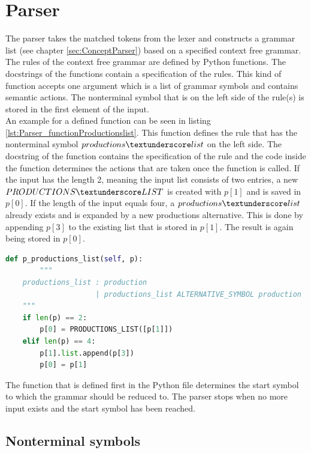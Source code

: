\section{Parser}\label{sec:ImplementationParser}
The parser takes the matched tokens from the lexer and constructs a grammar list (see chapter \ref{sec:ConceptParser}) based on a specified context free grammar.
The rules of the context free grammar are defined by Python functions.
The docstrings of the functions contain a specification of the rules.
This kind of function accepts one argument which is a list of grammar symbols and contains semantic actions. The nonterminal symbol that is on the left side of the rule(s) is stored in the first element of the input.\\
An example for a defined function can be seen in listing \ref{lst:Parser_functionProductionslist}.
This function defines the rule that has the nonterminal symbol $productions\textunderscore list$ on the left side.
The docstring of the function contains the specification of the rule and the code inside the function determines the actions that are taken once the function is called.
If the input has the length 2, meaning the input list consists of two entries, a new $PRODUCTIONS\textunderscore LIST$ is created with $p[1]$ and is saved in $p[0]$.
If the length of the input equals four, a $productions\textunderscore list$ already exists and is expanded by a new productions alternative.
This is done by appending $p[3]$ to the existing list that is stored in $p[1]$.
The result is again being stored in $p[0]$. \\

\begin{lstlisting}[language=Python, basicstyle=\scriptsize, caption= Productions list parser function, label= lst:Parser_functionProductionslist]
def p_productions_list(self, p):
		"""
    productions_list : production
                     | productions_list ALTERNATIVE_SYMBOL production
    """
    if len(p) == 2:
    	p[0] = PRODUCTIONS_LIST([p[1]])
    elif len(p) == 4:
        p[1].list.append(p[3])
        p[0] = p[1]
\end{lstlisting}

The function that is defined first in the Python file determines the start symbol to which the grammar should be reduced to.
The parser stops when no more input exists and the start symbol has been reached.

\subsection{Nonterminal symbols}\label{sec:ConceptParserDataStructure}


